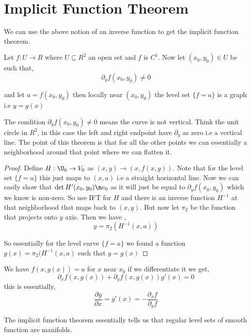 

\section{Implicit Function Theorem}
We can use the above notion of an inverse function to get the implicit function theorem.
\begin{theorem}
   Let $f: U \to R$  where $U \subseteq R^2$ an open set and $f$ is $C^{1}$. Now let $(x_{0}, y_{0}) \in U$ be such that, 
   \[
    \partial_y f(x_{0}, y_{0}) \ne 0
   \]

   and let $a = f(x_{0}, y_{0})$ then locally near $(x_{0}, y_{0})$ the level set $\{f = a\}$ is a graph i.e $y = g(x)$
\end{theorem}
\begin{note}
    The condition $\partial_y f(x_{0}, y_{0}) \ne 0$ means the curve is not vertical. Think the unit circle in $R^2$, in this case the left and right endpoint have $\partial_y$ as zero i.e a vertical line. The point of this theorem is that for all the other points we can essentially a neighborhood around that point where we can flatten it.
\end{note}

\begin{proof}
    Define $H: \U_{0} \to V_{0}$ as $(x,y) \to (x, f(x,y))$. Note that for the level set $\{f = a\}$ this just maps to $(x, a)$ i.e a straight horizontal line. Now we can easily show that $\det H'(x_{0}, y_{0}) \n e_{0}$ as it will just be equal to $\partial_y f(x_{0}, y_{0})$ which we know is non-zero. So use IFT for $H$ and there is an inverse function $H^{-1}$ at that neighborhood that maps back to $(x, y)$. But now let $\pi_{2}$ be the function that projects onto $y$ axis. Then we have ,
    \[
        y = \pi_{2}(H^{-1}(x, a))
    \]

    So essentially for the level curve $\{f = a\}$ we found a function $g(x) = \pi_{2} (H^{-1}(x, a)$ such that $y = g(x)$
\end{proof}

\begin{remark}
    We have $f(x, g(x)) = a$ for $x$ near $x_{0}$ if we differentiate it we get, 
    \[
        \partial_x f(x, g(x)) + \partial_y f(x, g(x)) g'(x) = 0
    \] 
    this is essentially, 
    \[
        \frac{\partial y}{\partial x} = g'(x) = - \frac{\partial_x f}{\partial_y f}
    \]
\end{remark}
The implicit function theorem essentially tells us that regular level sets of smooth function are manifolds.


